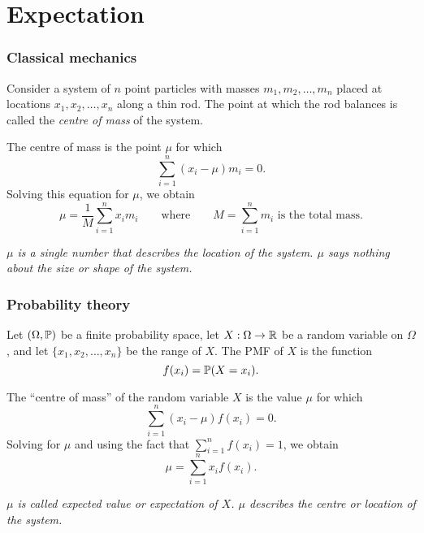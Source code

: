 \chapter{Expectation}\label{chap:expe}


\subsection*{Classical mechanics}
Consider a system of $n$ point particles with masses $m_1,m_2,\ldots,m_n$ placed at locations $x_1,x_2,\ldots,x_n$ along a thin rod. 
The point at which the rod balances is called the \emph{centre of mass} of the system.

\bigskip
The centre of mass is the point $\mu$ for which
\[
\sum_{i=1}^n (x_i-\mu)m_i = 0.
\]
Solving this equation for $\mu$, we obtain
\[
\mu = \frac{1}{M}\sum_{i=1}^n x_im_i\qquad\text{where}\qquad M = \sum_{i=1}^n m_i \text{ is the total mass}.
\]

\bit
\it $\mu$ is a single number that describes the \emph{location} of the system.
\it $\mu$ says nothing about the \emph{size} or \emph{shape} of the system.
\eit
	
\subsection*{Probability theory}
Let $(\Omega,\mathbb{P})$ be a finite probability space, let $X:\Omega\to\mathbb{R}$ be a random variable on $\Omega$, and let $\{x_1,x_2,\ldots,x_n\}$ be the range of $X$.
The PMF of $X$ is the function
\[
f(x_i) = \mathbb{P}(X=x_i).
\]

The ``centre of mass'' of the random variable $X$ is the value $\mu$ for which
\[
\sum_{i=1}^n (x_i-\mu)f(x_i) = 0.
\]
Solving for $\mu$ and using the fact that $\sum_{i=1}^n f(x_i) = 1$, we obtain
\[
\mu = \sum_{i=1}^n x_i f(x_i).
\]

\bit
\it $\mu$ is called \emph{expected value} or \emph{expectation} of $X$.
\it $\mu$ describes the \emph{centre} or \emph{location} of the system.
\eit

